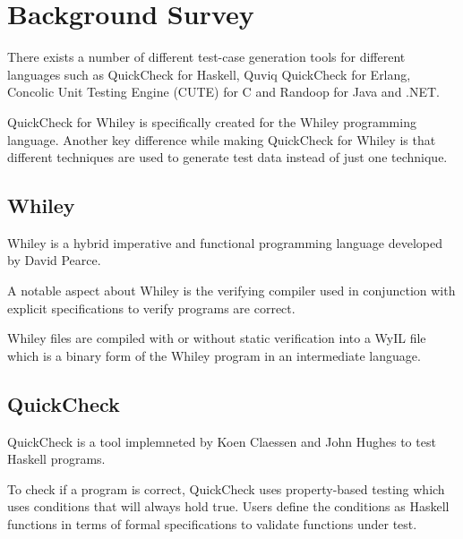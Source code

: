 \chapter{Background Survey}\label{chapter:background}


There exists a number of different test-case generation tools for different languages such as QuickCheck for Haskell, Quviq QuickCheck for Erlang, Concolic Unit Testing Engine (CUTE) for C and Randoop for Java and .NET.


QuickCheck for Whiley is specifically created for the Whiley programming language.
Another key difference while making QuickCheck for Whiley is that different techniques are used to generate test data instead of just one technique.

\section{Whiley}
Whiley is a hybrid imperative and functional programming language developed by David Pearce.

A notable aspect about Whiley is the verifying compiler used in conjunction with explicit specifications to verify programs are correct.


Whiley files are compiled with or without static verification into a WyIL file which is a binary form of the Whiley program in an intermediate language.





\section{QuickCheck}
QuickCheck is a tool implemneted by Koen Claessen and John Hughes \cite{QClightweight} to test Haskell programs.

To check if a program is correct, QuickCheck uses property-based testing which uses conditions that will always hold true. Users define the conditions as Haskell functions in terms of formal specifications to validate functions under test. 

